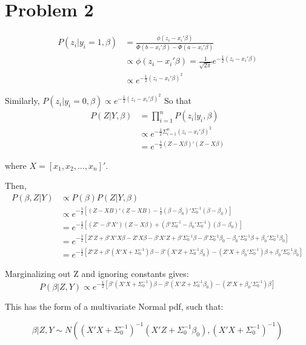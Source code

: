 \documentclass{article}
\begin{document}
\section{Problem 2}

\begin{align}
P(z_i | y_i=1, \beta) &= \frac{\phi(z_i-x_i'\beta)}{\Phi(b-x_i'\beta)-\Phi(a-x_i'\beta)} \\
 &\propto \phi(z_i-x_i'\beta) = \frac{1}{\sqrt{2\pi}}e^{-\frac{1}{2}(z_i-x_i'\beta)}\\ 
 & \propto e^{-\frac{1}{2}(z_i-x_i'\beta)^2}
\end{align}

Similarly, $P(z_i | y_i=0, \beta) \propto e^{-\frac{1}{2}(z_i-x_i'\beta)^2}$
So that 
\begin{align*}
P(Z|Y, \beta) &= \prod_{i=1}^n P(z_i | y_i, \beta)\\
& \propto  e^{-\frac{1}{2}\Sigma_{i=1}^n (z_i-x_i'\beta)^2}\\
& = e^{-\frac{1}{2}(Z-X\beta)'(Z-X\beta)}
\end{align*}

where $X=[x_1, x_2, ..., x_n]'.$

Then,
\begin{align*}
P(\beta, Z | Y) &\propto P(\beta)P(Z|Y,\beta)\\ 
&\propto e^{-\frac{1}{2}[(Z-XB)'(Z-XB) - \frac{1}{2}(\beta-\beta_0)'\Sigma_0^{-1}(\beta-\beta_0)]}\\
&= e^{-\frac{1}{2}[(Z'-\beta'X')(Z-X\beta) + (\beta'\Sigma_0^{-1}-\beta_0'\Sigma_0^{-1})(\beta-\beta_0)]}\\
&= e^{-\frac{1}{2}[Z'Z + \beta'X'X\beta - Z'X\beta - \beta'X'Z + \beta' \Sigma_0^{-1}\beta - \beta'\Sigma_0^{-1}\beta_0 - \beta_0'\Sigma_0^{-1}\beta + \beta_0' \Sigma_0^{-1}\beta_0]}\\
&=e^{-\frac{1}{2}[Z'Z + \beta'(X'X + \Sigma_0^{-1})\beta - \beta'(X'Z+\Sigma_0^{-1}\beta_0) - (Z'X + \beta_0'\Sigma_0^{-1})\beta + \beta_0'\Sigma_0^{-1}\beta_0]}
\end{align*}

Marginalizing out Z and ignoring constants gives:
$$P(\beta|Z,Y) \propto e^{-\frac{1}{2}[\beta'(X'X + \Sigma_0^{-1})\beta - \beta'(X'Z+\Sigma_0^{-1}\beta_0) - (Z'X + \beta_0'\Sigma_0^{-1})\beta]}$$

This has the form of a multivariate Normal pdf, such that:

$$\beta|Z,Y \sim N((X'X+\Sigma_0^{-1})^{-1}(X'Z+\Sigma_0^{-1}\beta_0), (X'X+\Sigma_0^{-1})^{-1})$$
\end{document}
